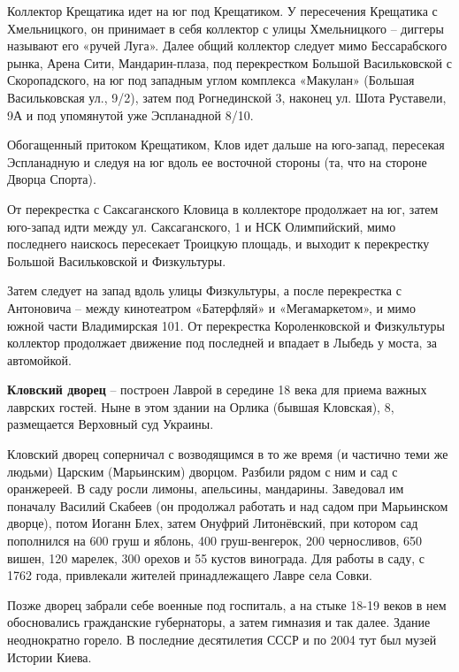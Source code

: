 Коллектор Крещатика идет на юг под Крещатиком. У пересечения Крещатика с Хмельницкого, он принимает в себя коллектор с улицы Хмельницкого – диггеры называют его «ручей Луга». Далее общий коллектор следует мимо Бессарабского рынка, Арена Сити, Мандар\-ин-плаза, под перекрестком Большой Васильковской с Скоропадского, на юг под западным углом комплекса «Макулан» (Большая Васильковская ул., 9/2), затем под Рогнединской 3, наконец ул. Шота Руставели, 9А и под упомянутой уже Эспланадной 8/10.

Обогащенный притоком Крещатиком, Клов идет дальше на юго-запад, пересекая Эспланадную и следуя на юг вдоль ее восточной стороны (та, что на стороне Дворца Спорта).

От перекрестка с Саксаганского Кловица в коллекторе продолжает на юг, затем юго-запад идти между ул. Саксаганского, 1 и НСК Олимпийский, мимо последнего наискось пересекает Троицкую площадь, и выходит к перекрестку Большой Васильковской и Физкультуры.

Затем следует на запад вдоль улицы Физкультуры, а после перекрестка с Антоновича – между кинотеатром «Батерфляй» и «Мегамаркетом», и мимо южной части Владимирская 101. От перекрестка Короленковской и Физкультуры коллектор продолжает движение под последней и впадает в Лыбедь у моста, за автомойкой.\\ 


\medskip

\textbf{Кловский дворец} – построен Лаврой в середине 18 века для приема важных лаврских гостей. Ныне в этом здании на Орлика (бывшая Кловская), 8, размещается Верховный суд Украины. 

Кловский дворец соперничал с возводящимся в то же время (и частично теми же людьми) Царским (Марьинским) дворцом. Разбили рядом с ним и сад с оранжереей. В саду росли лимоны, апельсины, мандарины. Заведовал им поначалу Василий Скабеев (он продолжал работать и над садом при Марьинском дворце), потом Иоганн Блех, затем Онуфрий Литонёвский, при котором сад пополнился на 600 груш и яблонь, 400 груш-венгерок, 200 черносливов, 650 вишен, 120 марелек, 300 орехов и 55 кустов винограда. Для работы в саду, с 1762 года, привлекали жителей принадлежащего Лавре села Совки.

Позже дворец забрали себе военные под госпиталь, а на стыке 18-19 веков в нем обосновались гражданские губернаторы, а затем гимназия и так далее. Здание неоднократно горело. В последние десятилетия СССР и по 2004 тут был музей Истории Киева.\\

